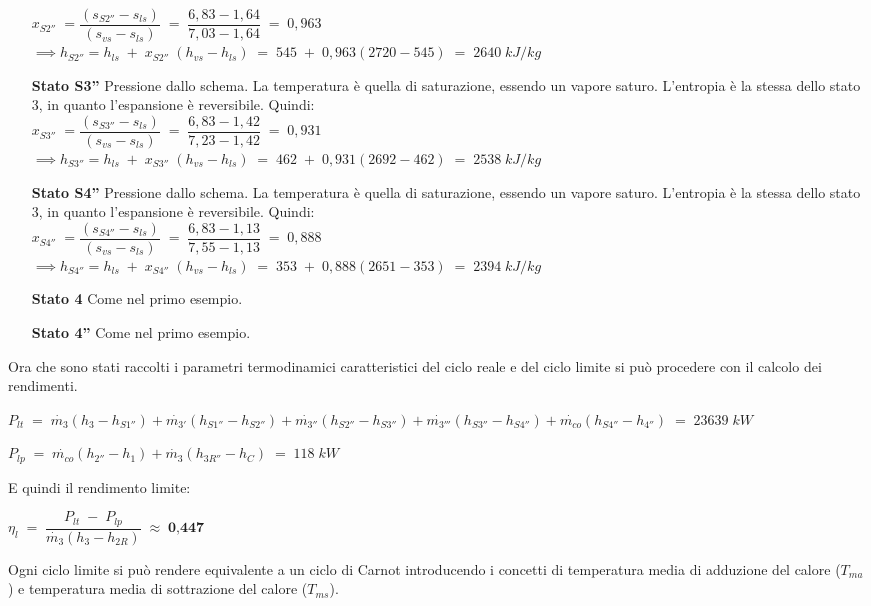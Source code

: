 \documentclass[a4paper, twoside, 12pt]{report}
\begin{document}
\begin{itemize}
	$x_{S2''}\;=\dfrac{(s_{S2''}-s_{ls})}{(s_{vs}-s_{ls})}\;=\;\dfrac{6,83-1,64}{7,03-1,64}\;=\;0,963$\\
	$\implies h_{S2''}=h_{ls}\;+\;x_{S2''}\;(h_{vs}-h_{ls})\;=\;545\;+\;0,963(2720-545)\;=\;2640\;kJ/kg$
	\item[\textbf{Stato S3''}] Pressione dallo schema. La temperatura è quella di saturazione, essendo un vapore saturo. L'entropia è la stessa dello stato 3, in quanto l'espansione è reversibile. Quindi:\\
	$x_{S3''}\;=\dfrac{(s_{S3''}-s_{ls})}{(s_{vs}-s_{ls})}\;=\;\dfrac{6,83-1,42}{7,23-1,42}\;=\;0,931$\\
	$\implies h_{S3''}=h_{ls}\;+\;x_{S3''}\;(h_{vs}-h_{ls})\;=\;462\;+\;0,931(2692-462)\;=\;2538\;kJ/kg$
	\item[\textbf{Stato S4''}] Pressione dallo schema. La temperatura è quella di saturazione, essendo un vapore saturo. L'entropia è la stessa dello stato 3, in quanto l'espansione è reversibile. Quindi:\\
	$x_{S4''}\;=\dfrac{(s_{S4''}-s_{ls})}{(s_{vs}-s_{ls})}\;=\;\dfrac{6,83-1,13}{7,55-1,13}\;=\;0,888$\\
	$\implies h_{S4''}=h_{ls}\;+\;x_{S4''}\;(h_{vs}-h_{ls})\;=\;353\;+\;0,888(2651-353)\;=\;2394\;kJ/kg$
	\item[\textbf{Stato 4  }] Come nel primo esempio.
	\item[\textbf{Stato 4''}] Come nel primo esempio.
\end{itemize}
Ora che sono stati raccolti i parametri termodinamici caratteristici del ciclo reale e del ciclo limite si può procedere con il calcolo dei rendimenti.
\begin{center}
	$P_{lt}\;=\;\dot{m_{3}}(h_{3}-h_{S1''})+\dot{m_{3'}}(h_{S1''}-h_{S2''})+\dot{m_{3''}}(h_{S2''}-h_{S3''})+\dot{m_{3'''}}(h_{S3''}-h_{S4''})+\dot{m_{co}}(h_{S4''}-h_{4''})\;=\;23639\;kW$
\end{center}
\begin{center}
	$P_{lp}\;=\;\dot{m_{co}}(h_{2''}-h_{1})+\dot{m_{3}}(h_{3R''}-h_{C})\;=\;118\;kW$
\end{center}
E quindi il rendimento limite:
\begin{center}
	$\eta_{l}\;=\;\dfrac{P_{lt}\;-\;P_{lp}}{\dot{m_{3}}(h_{3}-h_{2R})}\;\approx\;\textbf{0,447}$
\end{center}
Ogni ciclo limite si può rendere equivalente a un ciclo di Carnot introducendo i concetti di temperatura media di adduzione del calore ($T_{ma}$) e temperatura media di sottrazione del calore ($T_{ms}$).
\end{document}
